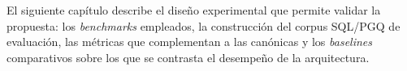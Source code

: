 El siguiente capítulo describe el diseño experimental que permite validar la propuesta: los \emph{benchmarks} empleados, la construcción del corpus \ac{SQL}/\ac{PGQ} de evaluación, las métricas que complementan a las canónicas y los \emph{baselines} comparativos sobre los que se contrasta el desempeño de la arquitectura.

